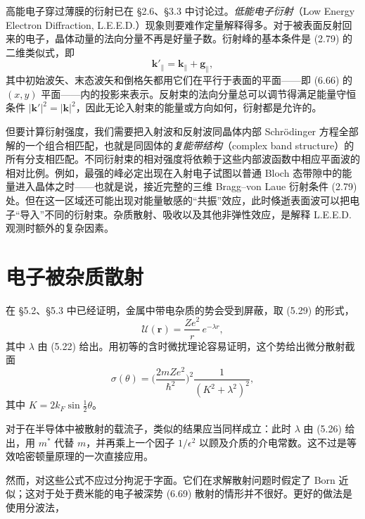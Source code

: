高能电子穿过薄膜的衍射已在 §2.6、§3.3 中讨论过。\emph{低能电子衍射}（Low Energy Electron Diffraction, L.E.E.D.）现象则要难作定量解释得多。对于被表面反射回来的电子，晶体动量的法向分量不再是好量子数。衍射峰的基本条件是 (2.79) 的二维类似式，即
\begin{equation*}
\mathbf{k}'_{\parallel}=\mathbf{k}_{\parallel}+\mathbf{g}_{\parallel}, \tag{6.68}
\end{equation*}
其中初始波矢、末态波矢和倒格矢都用它们在平行于表面的平面——即 (6.66) 的 $(x,y)$ 平面——内的投影来表示。反射束的法向分量总可以调节得满足能量守恒条件 $|\mathbf{k}'|^{2}=|\mathbf{k}|^{2}$，因此无论入射束的能量或方向如何，衍射都是允许的。

但要计算衍射强度，我们需要把入射波和反射波同晶体内部 Schrödinger 方程全部解的一个组合相匹配，也就是同固体的\emph{复能带结构}（complex band structure）的所有分支相匹配。不同衍射束的相对强度将依赖于这些内部波函数中相应平面波的相对比例。例如，最强的峰必定出现在入射电子试图以普通 Bloch 态带隙中的能量进入晶体之时——也就是说，接近完整的三维 Bragg--von Laue 衍射条件 (2.79) 处。但在这一区域还可能出现对能量敏感的“共振”效应，此时倏逝表面波可以把电子“导入”不同的衍射束。杂质散射、吸收以及其他非弹性效应，是解释 L.E.E.D. 观测时额外的复杂因素。

\section{电子被杂质散射}

在 §5.2、§5.3 中已经证明，金属中带电杂质的势会受到屏蔽，取 (5.29) 的形式，
\begin{equation*}
\mathcal{U}(\mathbf{r})=\frac{Ze^{2}}{r}\,e^{-\lambda r}, \tag{6.69}
\end{equation*}
其中 $\lambda$ 由 (5.22) 给出。用初等的含时微扰理论容易证明，这个势给出微分散射截面
\begin{equation*}
\sigma(\theta)=\biggl(\frac{2mZe^{2}}{\hbar^{2}}\biggr)^{2}\frac{1}{(K^{2}+\lambda^{2})^{2}}, \tag{6.70}
\end{equation*}
其中 $K=2k_{F}\sin\tfrac{1}{2}\theta$。

对于在半导体中被散射的载流子，类似的结果应当同样成立：此时 $\lambda$ 由 (5.26) 给出，用 $m^{*}$ 代替 $m$，并再乘上一个因子 $1/\epsilon^{2}$ 以顾及介质的介电常数。这不过是等效哈密顿量原理的一次直接应用。

然而，对这些公式不应过分拘泥于字面。它们在求解散射问题时假定了 Born 近似；这对于处于费米能的电子被深势 (6.69) 散射的情形并不很好。更好的做法是使用分波法，
